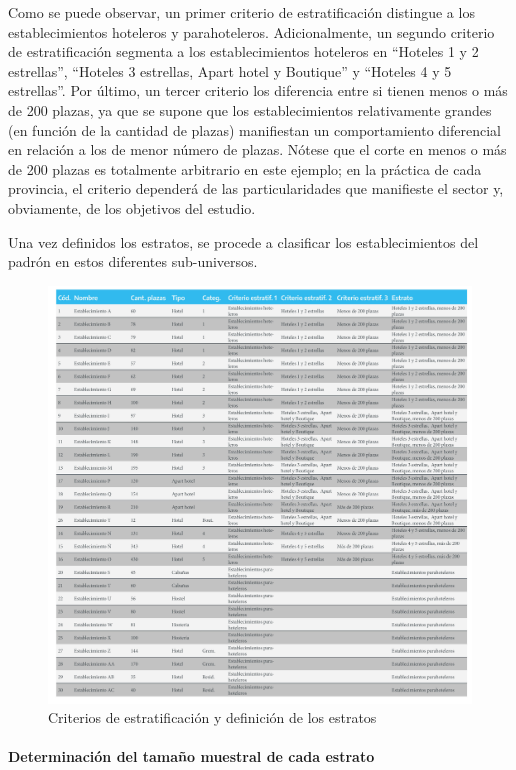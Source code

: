 \documentclass[
]{book}
\begin{document}
Como se puede observar, un primer criterio de estratificación distingue a los establecimientos hoteleros y parahoteleros. Adicionalmente, un segundo criterio de estratificación segmenta a los establecimientos hoteleros en ``Hoteles 1 y 2 estrellas'', ``Hoteles 3 estrellas, Apart hotel y Boutique'' y ``Hoteles 4 y 5 estrellas''. Por último, un tercer criterio los diferencia entre si tienen menos o más de 200 plazas, ya que se supone que los establecimientos relativamente grandes (en función de la cantidad de plazas) manifiestan un comportamiento diferencial en relación a los de menor número de plazas. Nótese que el corte en menos o más de 200 plazas es totalmente arbitrario en este ejemplo; en la práctica de cada provincia, el criterio dependerá de las particularidades que manifieste el sector y, obviamente, de los objetivos del estudio.

Una vez definidos los estratos, se procede a clasificar los establecimientos del padrón en estos diferentes sub-universos.

\begin{figure}

{\centering \includegraphics[width=0.8\linewidth]{imagenes/tabla_2} 

}

\caption{ Criterios de estratificación y definición de los estratos}\label{fig:criterios-estratos}
\end{figure}

\hypertarget{determinaciuxf3n-del-tamauxf1o-muestral-de-cada-estrato}{%
\paragraph{Determinación del tamaño muestral de cada estrato}\label{determinaciuxf3n-del-tamauxf1o-muestral-de-cada-estrato}}
\end{document}
